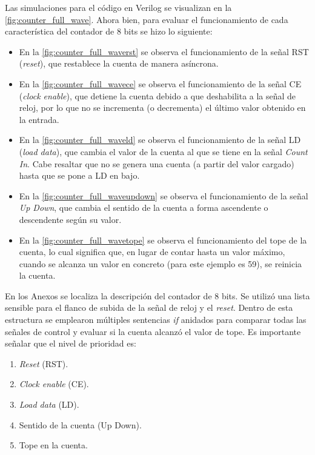 Las simulaciones para el código en Verilog se visualizan en la \autoref{fig:counter_full_wave}. Ahora bien, para evaluar el funcionamiento de cada característica del contador de 8 bits se hizo lo siguiente:

\begin{itemize}
	\item En la \autoref{fig:counter_full_waverst} se observa el funcionamiento de la señal RST (\textit{reset}), que restablece la cuenta de manera asíncrona.
	\item En la \autoref{fig:counter_full_wavece} se observa el funcionamiento de la señal CE (\textit{clock enable}), que detiene la cuenta debido a que deshabilita a la señal de reloj, por lo que no se incrementa (o decrementa) el último valor obtenido en la entrada.
	\item En la \autoref{fig:counter_full_waveld} se observa el funcionamiento de la señal LD (\textit{load data}), que cambia el valor de la cuenta al que se tiene en la señal \textit{Count In}. Cabe resaltar que no se genera una cuenta (a partir del valor cargado) hasta que se pone a LD en bajo.
	\item En la \autoref{fig:counter_full_waveupdown} se observa el funcionamiento de la señal \textit{Up Down}, que cambia el sentido de la cuenta a forma ascendente o descendente según su valor.
	\item En la \autoref{fig:counter_full_wavetope} se observa el funcionamiento del tope de la cuenta, lo cual significa que, en lugar de contar hasta un valor máximo, cuando se alcanza un valor en concreto (para este ejemplo es 59), se reinicia la cuenta.
\end{itemize}

En los Anexos se localiza la descripción del contador de 8 bits. Se utilizó una lista sensible para el flanco de subida de la señal de reloj y el \textit{reset}. Dentro de esta estructura se emplearon múltiples sentencias \textit{if} anidados para comparar todas las señales de control y evaluar si la cuenta alcanzó el valor de tope. Es importante señalar que el nivel de prioridad es: 
\begin{enumerate}
	\item \textit{Reset} (RST).
	\item \textit{Clock enable} (CE).
	\item \textit{Load data} (LD).
	\item Sentido de la cuenta (Up Down).
	\item Tope en la cuenta.
\end{enumerate}

